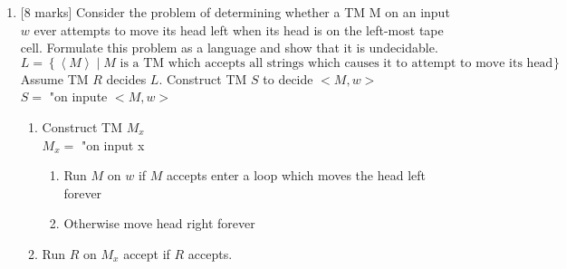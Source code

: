 \documentclass{article}
\newcommand{\set}[1]{{\left\{#1\right\}}}    %
\newcommand{\enc}[1]{\left<#1\right>}
\begin{document}
\begin{enumerate}
\begin{enumerate}
        \item {[8 marks]} Consider the problem of determining whether a TM M on an input $w$ ever attempts to move its head left when its head is on the left-most tape cell. Formulate this problem as a language and show that it is undecidable.\\
        $L=\set{\enc{M}\mid M\text{ is a TM which accepts all strings which causes it to attempt to move its head off of the left side of the tape}}$
        Assume TM $R$ decides $L$. Construct TM $S$ to decide $<M, w>$\\
        $S =$ "on inpute $<M, w>$
        \begin{enumerate}
        	\item Construct TM $M_x$\\
        		$M_x =$ "on input x
        		\begin{enumerate}
        			\item Run $M$ on $w$ if $M$ accepts enter a loop which moves the head left forever
        			\item Otherwise move head right forever
        		\end{enumerate}
        	\item Run $R$ on $M_x$ accept if $R$ accepts.
        \end{enumerate}
    \end{enumerate}
 \end{enumerate}
\end{document}
